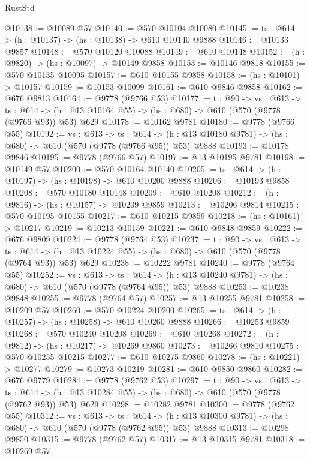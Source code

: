 \begin{lexlean}{RustStd}
\begin{coremodule}
@10138 := @10089 @57
@10140 := @570 @10104 @10080
@10145 := {ts : @614} -> (h : @10137) -> (hs : @10138) -> @610 @10140 @9888
@10146 := @10133 @9857
@10148 := @570 @10120 @10088
@10149 := @610 @10148
@10152 := (h : @9820) -> (hs : @10097) -> @10149 @9858
@10153 := @10146 @9818
@10155 := @570 @10135 @10095
@10157 := @610 @10155 @9858
@10158 := (hs : @10101) -> @10157
@10159 := @10153 @10099
@10161 := @610 @9846 @9858
@10162 := @676 @9813
@10164 := @9778 (@9766 @53)
@10177 := {t : @90} ->
  {vs : @613} ->
  {ts : @614} -> (h : @13 @10164 @55) -> (hs : @680) -> @610 (@570 (@9778 (@9766 @93)) @53) @629
@10178 := @10162 @9781
@10180 := @9778 (@9766 @55)
@10192 := {vs : @613} ->
  {ts : @614} -> (h : @13 @10180 @9781) -> (hs : @680) -> @610 (@570 (@9778 (@9766 @95)) @53) @9888
@10193 := @10178 @9846
@10195 := @9778 (@9766 @57)
@10197 := @13 @10195 @9781
@10198 := @10149 @57
@10200 := @570 @10164 @10140
@10205 := {ts : @614} -> (h : @10197) -> (hs : @10198) -> @610 @10200 @9888
@10206 := @10193 @9858
@10208 := @570 @10180 @10148
@10209 := @610 @10208
@10212 := (h : @9816) -> (hs : @10157) -> @10209 @9859
@10213 := @10206 @9814
@10215 := @570 @10195 @10155
@10217 := @610 @10215 @9859
@10218 := (hs : @10161) -> @10217
@10219 := @10213 @10159
@10221 := @610 @9848 @9859
@10222 := @676 @9809
@10224 := @9778 (@9764 @53)
@10237 := {t : @90} ->
  {vs : @613} ->
  {ts : @614} -> (h : @13 @10224 @55) -> (hs : @680) -> @610 (@570 (@9778 (@9764 @93)) @53) @629
@10238 := @10222 @9781
@10240 := @9778 (@9764 @55)
@10252 := {vs : @613} ->
  {ts : @614} -> (h : @13 @10240 @9781) -> (hs : @680) -> @610 (@570 (@9778 (@9764 @95)) @53) @9888
@10253 := @10238 @9848
@10255 := @9778 (@9764 @57)
@10257 := @13 @10255 @9781
@10258 := @10209 @57
@10260 := @570 @10224 @10200
@10265 := {ts : @614} -> (h : @10257) -> (hs : @10258) -> @610 @10260 @9888
@10266 := @10253 @9859
@10268 := @570 @10240 @10208
@10269 := @610 @10268
@10272 := (h : @9812) -> (hs : @10217) -> @10269 @9860
@10273 := @10266 @9810
@10275 := @570 @10255 @10215
@10277 := @610 @10275 @9860
@10278 := (hs : @10221) -> @10277
@10279 := @10273 @10219
@10281 := @610 @9850 @9860
@10282 := @676 @9779
@10284 := @9778 (@9762 @53)
@10297 := {t : @90} ->
  {vs : @613} ->
  {ts : @614} -> (h : @13 @10284 @55) -> (hs : @680) -> @610 (@570 (@9778 (@9762 @93)) @53) @629
@10298 := @10282 @9781
@10300 := @9778 (@9762 @55)
@10312 := {vs : @613} ->
  {ts : @614} -> (h : @13 @10300 @9781) -> (hs : @680) -> @610 (@570 (@9778 (@9762 @95)) @53) @9888
@10313 := @10298 @9850
@10315 := @9778 (@9762 @57)
@10317 := @13 @10315 @9781
@10318 := @10269 @57

\end{coremodule}
\end{lexlean}
